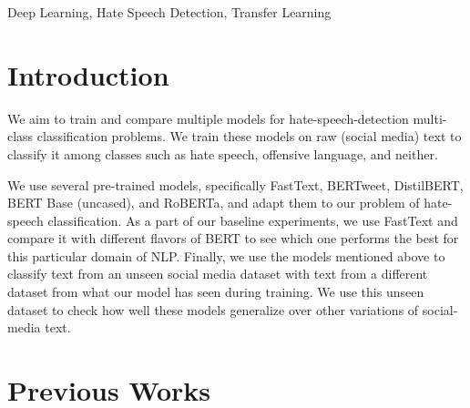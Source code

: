 \documentclass[a4paper, 10pt, conference]{IEEEtran}
\begin{document}
\begin{IEEEkeywords}
Deep Learning, Hate Speech Detection, Transfer Learning
\end{IEEEkeywords}

\IEEEpeerreviewmaketitle
\section{Introduction}
{We aim to train and compare multiple models for hate-speech-detection multi-class classification problems. We train these models on raw (social media) text to classify it among classes such as hate speech, offensive language, and neither.}

{We use several pre-trained models, specifically FastText, BERTweet, DistilBERT, BERT Base (uncased), and RoBERTa, and adapt them to our problem of hate-speech classification.
As a part of our baseline experiments, we use FastText and compare it with different flavors of BERT to see which one performs the best for this particular domain of NLP.
Finally, we use the models mentioned above to classify text from an unseen social media dataset with text from a different dataset from what our model has seen during training. We use this unseen dataset to check how well these models generalize over other variations of social-media text.}

\section{Previous Works}
\end{document}
